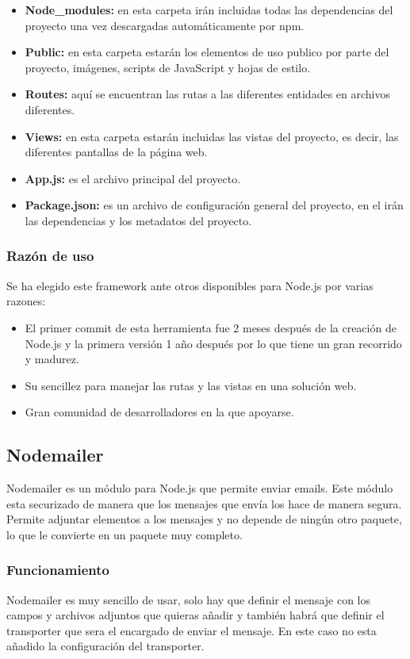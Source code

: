 \begin{itemize}
	\item \textbf{Node\_modules:} en esta carpeta irán incluidas todas las dependencias del proyecto una vez descargadas automáticamente por npm.
	\item \textbf{Public:} en esta carpeta estarán los elementos de uso publico por parte del proyecto, imágenes, scripts de JavaScript y hojas de estilo.
	\item \textbf{Routes:} aquí se encuentran las rutas a las diferentes entidades en archivos diferentes.
	\item \textbf{Views:} en esta carpeta estarán incluidas las vistas del proyecto, es decir, las diferentes pantallas de la página web.
	\item \textbf{App.js:} es el archivo principal del proyecto.
	\item \textbf{Package.json:} es un archivo de configuración general del proyecto, en el irán las dependencias y los metadatos del proyecto.
\end{itemize}

\subsubsection{Razón de uso}
Se ha elegido este framework ante otros disponibles para Node.js por varias razones:

\begin{itemize}
	\item El primer commit de esta herramienta fue 2 meses después de la creación de Node.js y la primera versión 1 año después por lo que tiene un gran recorrido y madurez.
	\item Su sencillez para manejar las rutas y las vistas en una solución web.
	\item Gran comunidad de desarrolladores en la que apoyarse.
\end{itemize}

\subsection{Nodemailer}
Nodemailer\cite{nodemailer} es un módulo para Node.js que permite enviar emails. Este módulo esta securizado de manera que los mensajes que envía los hace de manera segura. Permite adjuntar elementos a los mensajes y no depende de ningún otro paquete, lo que le convierte en un paquete muy completo.

\subsubsection{Funcionamiento}
Nodemailer es muy sencillo de usar, solo hay que definir el mensaje con los campos y archivos adjuntos que quieras añadir y también habrá que definir el transporter que sera el encargado de enviar el mensaje. En este caso no esta añadido la configuración del transporter.\\

